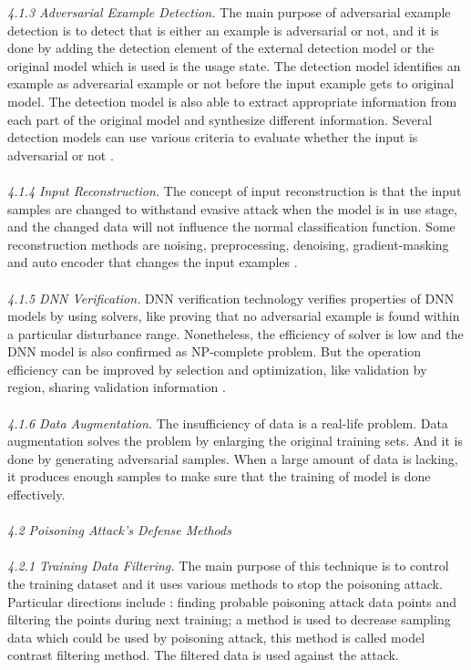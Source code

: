 \documentclass{article}
\begin{document}
	\textit{4.1.3 Adversarial Example Detection.}
	The main purpose of adversarial example detection is to detect that is either an example is adversarial or not, and it is done by adding the detection element of the external detection model or the original model which is used is the usage state. The detection model identifies an example as adversarial example or not before the input example gets to original model. The detection model is also able to extract appropriate information from each part of the original model and synthesize different information. Several detection models can use various criteria to evaluate whether the input is adversarial or not \cite{carrara2018adversarial}.
	\\\\
	\textit{4.1.4 Input Reconstruction.}
	The concept of input reconstruction is that the input samples are changed to withstand evasive attack when the model is in use stage, and the changed data will not influence the normal classification function. Some reconstruction methods are noising, preprocessing, denoising, gradient-masking and auto encoder that changes the input examples \cite{gu2014towards}.
	\\\\
	\textit{4.1.5 DNN Verification.}
	DNN verification technology verifies properties of DNN models by using solvers, like proving that no adversarial example is found within a particular disturbance range. Nonetheless, the efficiency of solver is low and the DNN model is also confirmed as NP-complete problem. But the operation efficiency can be improved by selection and optimization, like validation by region, sharing validation information \cite{qian2020towards}.
	\\\\
	\textit{4.1.6 Data Augmentation.}
	The insufficiency of data is a real-life problem. Data augmentation solves the problem by enlarging the original training sets. And it is done by generating adversarial samples. When a large amount of data is lacking, it produces enough samples to make sure that the training of model is done effectively\cite{shi2018schmidt}.
	\\\\
	\textit{4.2 Poisoning Attack’s Defense Methods}
	\\\\
	\textit{4.2.1 Training Data Filtering.}
	The main purpose of this technique is to control the training dataset and it uses various methods to stop the poisoning attack. Particular directions include \cite{laishram2016curie}: finding probable poisoning attack data points and filtering the points during next training; a method is used to decrease sampling data which could be used by poisoning attack, this method is called model contrast filtering method. The filtered data is used against the attack.
\end{document}
